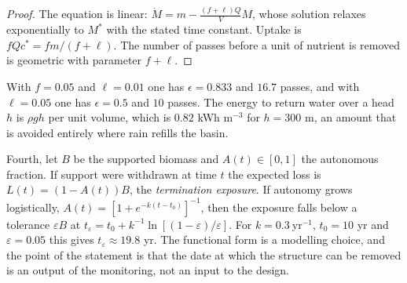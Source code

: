 \begin{proof}
The equation is linear: $\dot M=m-\frac{(f+\ell)Q}{V}M$, whose solution relaxes exponentially to $M^\ast$ with the stated time constant. Uptake is $fQc^\ast=fm/(f+\ell)$. The number of passes before a unit of nutrient is removed is geometric with parameter $f+\ell$.
\end{proof}

With $f=0.05$ and $\ell=0.01$ one has $\epsilon=0.833$ and $16.7$ passes, and with $\ell=0.05$ one has $\epsilon=0.5$ and $10$ passes. The energy to return water over a head $h$ is $\rho gh$ per unit volume, which is $0.82$ kWh m$^{-3}$ for $h=300$ m, an amount that is avoided entirely where rain refills the basin.

Fourth, let $B$ be the supported biomass and $A(t)\in[0,1]$ the autonomous fraction. If support were withdrawn at time $t$ the expected loss is $L(t)=(1-A(t))B$, the \emph{termination exposure}. If autonomy grows logistically, $A(t)=[1+e^{-k(t-t_0)}]^{-1}$, then the exposure falls below a tolerance $\varepsilon B$ at $t_\varepsilon=t_0+k^{-1}\ln[(1-\varepsilon)/\varepsilon]$. For $k=0.3\ \mathrm{yr^{-1}}$, $t_0=10$ yr and $\varepsilon=0.05$ this gives $t_\varepsilon\approx19.8$ yr. The functional form is a modelling choice, and the point of the statement is that the date at which the structure can be removed is an output of the monitoring, not an input to the design.
